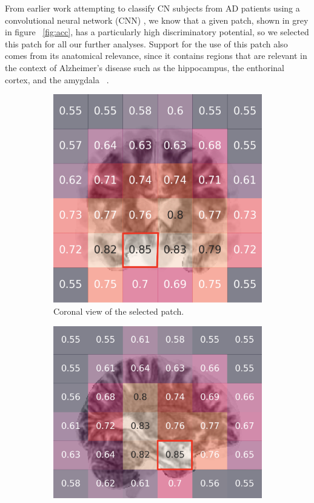 \documentclass{article}
\begin{document}
From earlier work attempting to classify CN subjects from AD patients using a convolutional neural network (CNN) \citep{bruningk2020image}, we know that a given patch, shown in grey in figure ~\ref{fig:acc}, has a particularly high discriminatory potential, so we selected this patch for all our further analyses. Support for the use of this patch also comes from its anatomical relevance, since it contains regions that are relevant in the context of Alzheimer's disease such as the hippocampus, the enthorinal cortex, and the amygdala ~\citep{goedert2006century}.

\begin{figure}[b]
  \centering
  \begin{subfigure}{0.32\textwidth}
    \includegraphics[width=\textwidth]{figures/perf_coronal.png}
    \caption{Coronal view of the selected patch.}
  \end{subfigure}
  \hfill
  \begin{subfigure}{0.32\textwidth}
    \includegraphics[width=\textwidth]{figures/perf_saggital.png}

\end{subfigure}
\end{figure}
\end{document}
